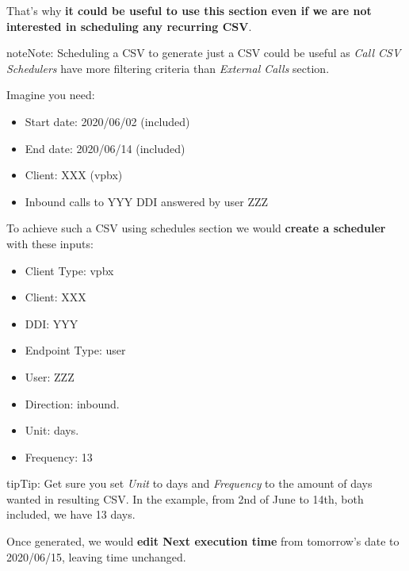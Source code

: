 \documentclass[letterpaper,10pt,english]{sphinxmanual}
\begin{document}
That's why \textbf{it could be useful to use this section even if we are not interested in scheduling any recurring CSV}.

\begin{notice}{note}{Note:}
Scheduling a CSV to generate just a CSV could be useful as \emph{Call CSV Schedulers} have more filtering criteria
than \emph{External Calls} section.
\end{notice}

Imagine you need:
\begin{itemize}
\item {} 
Start date: 2020/06/02 (included)

\item {} 
End date: 2020/06/14 (included)

\item {} 
Client: XXX (vpbx)

\item {} 
Inbound calls to YYY DDI answered by user ZZZ

\end{itemize}

To achieve such a CSV using schedules section we would \textbf{create a scheduler} with these inputs:
\begin{itemize}
\item {} 
Client Type: vpbx

\item {} 
Client: XXX

\item {} 
DDI: YYY

\item {} 
Endpoint Type: user

\item {} 
User: ZZZ

\item {} 
Direction: inbound.

\item {} 
Unit: days.

\item {} 
Frequency: 13

\end{itemize}

\begin{notice}{tip}{Tip:}
Get sure you set \emph{Unit} to days and \emph{Frequency} to the amount of days wanted in resulting CSV. In the example,
from 2nd of June to 14th, both included, we have 13 days.
\end{notice}

Once generated, we would \textbf{edit Next execution time} from tomorrow's date to 2020/06/15, leaving time unchanged.
\end{document}
